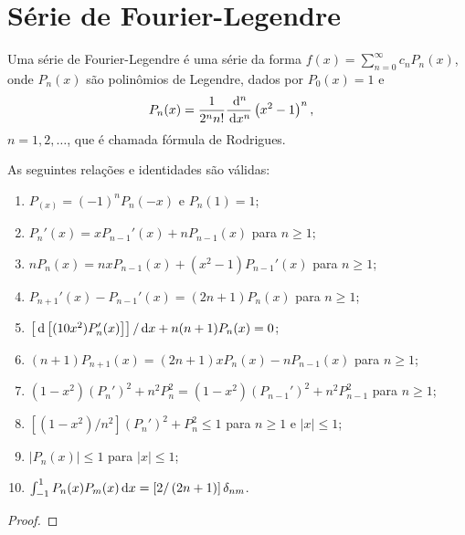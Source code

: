 \section{S\'{e}rie de Fourier-Legendre}
Uma s\'{e}rie de Fourier-Legendre \'{e} uma s\'{e}rie da forma $f(x) = \sum_{n = 0}^\infty c_n P_n(x)$, onde $P_n(x)$ s\~{a}o polin\^{o}mios de Legendre, dados por $P_0(x) = 1$ e
\begin{align*}
    P_n(x) &= \frac{1}{2^n n!} \frac{\, \mathrm{d}^n}{\, \mathrm{d}x^n}\left( x^2 - 1 \right)^n,
\end{align*}
$n = 1, 2, \ldots$, que \'{e} chamada f\'{o}rmula de Rodrigues.
\begin{prop}
    As seguintes rela\c{c}\~{o}es e identidades s\~{a}o v\'{a}lidas:
    \begin{enumerate}
        \item $P_(x) = (-1)^n P_n(-x)$ e $P_n(1) = 1$;
        \item $P_n'(x) = x P_{n - 1}'(x) + n P_{n - 1}(x)$ para $n \geq 1$;
        \item $n P_n(x) = n x P_{n - 1}(x) + \left( x^2 - 1 \right) P_{n - 1}'(x)$ para $n \geq 1$;
        \item $P_{n + 1}'(x) - P_{n - 1}'(x) = \left( 2 n + 1 \right) P_n(x)$ para $n \geq 1$;
        \item $\left[ \, \mathrm{d}\left[ (1 0 x^2) P_n'(x) \right] \right] / \, \mathrm{d}x + n (n + 1) P_n(x) = 0$;
        \item $(n + 1) P_{n + 1}(x) = (2n + 1) x P_n(x) - n P_{n - 1}(x)$ para $n \geq 1$;
        \item $(1 - x^2) (P_n')^2 + n^2 P_n^2 = (1 - x^2) (P_{n - 1}')^2 + n^2 P_{n - 1}^2$ para $n \geq 1$;
        \item $\left[ (1 - x^2) / n^2 \right] (P_n')^2 + P_n^2 \leq 1$ para $n \geq 1$ e $|x| \leq 1$;
        \item $| P_n(x) | \leq 1$ para $|x| \leq 1$;
        \item $\int_{-1}^1 P_n(x) P_m(x) \, \mathrm{d}x = \left[ 2 / \left( 2 n + 1 \right) \right] \delta_{nm}$.
    \end{enumerate}
\end{prop}
\begin{proof}
\end{proof}
